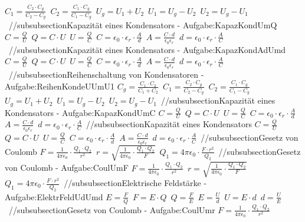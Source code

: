 $ C_{1}  = \frac{C_{2} \cdot C_{g} }{C_{2} -C_{g} } $\ 
$ C_{2}  = \frac{C_{1} \cdot C_{g} }{C_{1} -C_{g} } $\ 
$ U_{g}  = U_{1}  + U_{2} $\ 
$ U_{1}  = U_{g}  - U_{2} $\ 
$ U_{2}  = U_{g}  - U_{1} $\ 
//subsubsection{Kapazität eines Kondensators - Aufgabe:KapazKondUmQ} 
$ C = \frac{Q}{U} $\ 
$ Q = C\cdot U $\ 
$ U = \frac{Q}{C} $\ 
$ C = \epsilon _{0} \cdot \epsilon _{r} \cdot \frac{A}{d} $\ 
$ A = \frac{C\cdot d}{\epsilon _{0} \epsilon _{r} } $\ 
$ d = \epsilon _{0} \cdot \epsilon _{r} \cdot \frac{A}{C} $\ 
//subsubsection{Kapazität eines Kondensators - Aufgabe:KapazKondAdUmd} 
$ C = \frac{Q}{U} $\ 
$ Q = C\cdot U $\ 
$ U = \frac{Q}{C} $\ 
$ C = \epsilon _{0} \cdot \epsilon _{r} \cdot \frac{A}{d} $\ 
$ A = \frac{C\cdot d}{\epsilon _{0} \epsilon _{r} } $\ 
$ d = \epsilon _{0} \cdot \epsilon _{r} \cdot \frac{A}{C} $\ 
//subsubsection{Reihenschaltung von Kondensatoren - Aufgabe:ReihenKondeUUmU1} 
$ C_{g}  = \frac{C_{1} \cdot C_{2} }{C_{1} +C_{2} } $\ 
$ C_{1}  = \frac{C_{2} \cdot C_{g} }{C_{2} -C_{g} } $\ 
$ C_{2}  = \frac{C_{1} \cdot C_{g} }{C_{1} -C_{g} } $\ 
$ U_{g}  = U_{1}  + U_{2} $\ 
$ U_{1}  = U_{g}  - U_{2} $\ 
$ U_{2}  = U_{g}  - U_{1} $\ 
//subsubsection{Kapazität eines Kondensators - Aufgabe:KapazKondUmC} 
$ C = \frac{Q}{U} $\ 
$ Q = C\cdot U $\ 
$ U = \frac{Q}{C} $\ 
$ C = \epsilon _{0} \cdot \epsilon _{r} \cdot \frac{A}{d} $\ 
$ A = \frac{C\cdot d}{\epsilon _{0} \epsilon _{r} } $\ 
$ d = \epsilon _{0} \cdot \epsilon _{r} \cdot \frac{A}{C} $\ 
//subsubsection{Kapazität eines Kondensators} 
$ C = \frac{Q}{U} $\ 
$ Q = C\cdot U $\ 
$ U = \frac{Q}{C} $\ 
$ C = \epsilon _{0} \cdot \epsilon _{r} \cdot \frac{A}{d} $\ 
$ A = \frac{C\cdot d}{\epsilon _{0} \epsilon _{r} } $\ 
$ d = \epsilon _{0} \cdot \epsilon _{r} \cdot \frac{A}{C} $\ 
//subsubsection{Gesetz von Coulomb} 
$ F = \frac{ 1}{4\pi \epsilon _{0} } \cdot  \frac{Q_{1} \cdot Q_{2} }{  r^{2} } $\ 
$ r = \sqrt{\frac{  1}{4\pi \epsilon _{0} } \cdot  \frac{Q_{1} \cdot Q_{2} }{  F}} $\ 
$ Q_{1}  = 4\pi \epsilon _{0}  \cdot  \frac{F\cdot r^{2} }{ Q_{2} } $\ 
//subsubsection{Gesetz von Coulomb - Aufgabe:CoulUmF} 
$ F = \frac{ 1}{4\pi \epsilon _{0} } \cdot  \frac{Q_{1} \cdot Q_{2} }{  r^{2} } $\ 
$ r = \sqrt{\frac{  1}{4\pi \epsilon _{0} } \cdot  \frac{Q_{1} \cdot Q_{2} }{  F}} $\ 
$ Q_{1}  = 4\pi \epsilon _{0}  \cdot  \frac{F\cdot r^{2} }{ Q_{2} } $\ 
//subsubsection{Elektrische Feldstärke - Aufgabe:ElektrFeldUdUmd} 
$ E = \frac{F}{Q} $\ 
$ F = E\cdot Q $\ 
$ Q = \frac{F}{E} $\ 
$ E = \frac{U}{d} $\ 
$ U = E\cdot d $\ 
$ d = \frac{U}{E} $\ 
//subsubsection{Gesetz von Coulomb - Aufgabe:CoulUmr} 
$ F = \frac{ 1}{4\pi \epsilon _{0} } \cdot  \frac{Q_{1} \cdot Q_{2} }{  r^{2} } $\ 
